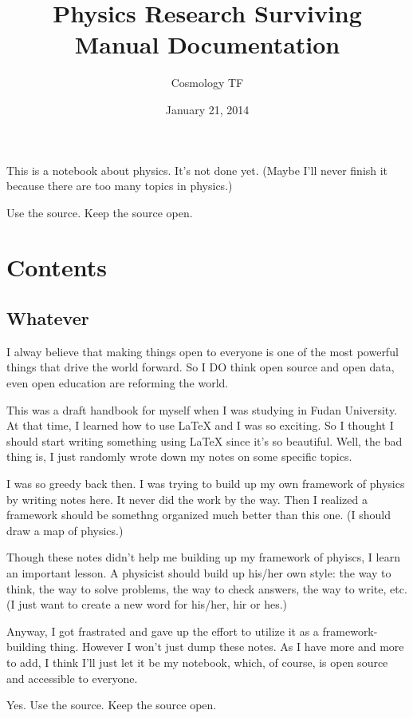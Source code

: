 \documentclass[letterpaper,10pt,english]{sphinxmanual}
\title{Physics Research Surviving Manual Documentation}
\date{January 21, 2014}
\author{Cosmology TF}
\begin{document}
\maketitle
\tableofcontents
{}\label{index::doc}


This is a notebook about physics. It's not done yet. (Maybe I'll never finish it because there are too many topics in physics.)

Use the source. Keep the source open.


\chapter{Contents}
\label{index:welcome-to-physics-research-survival-manual}\label{index:contents}

\section{Whatever}
\label{preface::doc}\label{preface:whatever}
I alway believe that making things open to everyone is one of the most powerful things that drive the world forward. So I DO think open source and open data, even open education are reforming the world.

This was a draft handbook for myself when I was studying in Fudan University. At that time, I learned how to use LaTeX and I was so exciting. So I thought I should start writing something using LaTeX since it's so beautiful. Well, the bad thing is, I just randomly wrote down my notes on some specific topics.

I was so greedy back then. I was trying to build up my own framework of physics by writing notes here. It never did the work by the way. Then I realized a framework should be somethng organized much better than this one. (I should draw a map of physics.)

Though these notes didn't help me building up my framework of phyiscs, I learn an important lesson. A physicist should build up his/her own style: the way to think, the way to solve problems, the way to check answers, the way to write, etc.  (I just want to create a new word for his/her, hir or hes.)

Anyway, I got frastrated and gave up the effort to utilize it as a framework-building thing. However I won't just dump these notes. As I have more and more to add, I think I'll just let it be my notebook, which, of course, is open source and accessible to everyone.

Yes. Use the source. Keep the source open.
\end{document}
